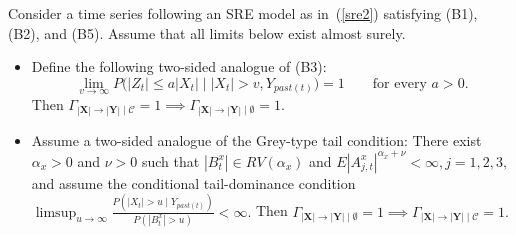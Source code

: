\documentclass[a4paper,11pt]{article}
\newenvironment{customlem}[1]
  {\renewcommand\theinnercustomlem{#1}\innercustomlem}
  {\endinnercustomlem}
\begin{document}
\begin{customlem}{\ref{Theorem1_both_tails_lemma}}
Consider a time series following an SRE model as in~(\ref{sre2}) satisfying
(B1), (B2), and (B5). Assume that all limits below exist almost surely.

\begin{itemize}
    \item Define the following two-sided analogue of (B3):
\[
\tag{B3$^\pm$}
\lim_{v\to\infty}
P\bigl(|Z_t|\leq a|X_t| \mid |X_t|>v,Y_{past(t)}\bigr)=1
\qquad\text{for every }a>0.
\]
Then \(
\Gamma_{|\mathbf X|\to|\mathbf Y|\mid\mathcal C}=1
\implies
\Gamma_{|\mathbf X|\to|\mathbf Y|\mid\emptyset}=1.
\)

 \item Assume a two-sided analogue of the Grey-type tail condition: There exist
\(\alpha_x>0\) and \(\nu>0\) such that \(|B_t^x|\in RV(\alpha_x)\) and
\(
E|A^x_{j,t}|^{\alpha_x+\nu}<\infty,
 j=1,2,3,
\)
and assume the conditional tail-dominance condition
\(
\limsup_{u\to\infty}
\frac{P(|X_t|>u\mid Y_{past(t)})}{P(|B_t^x|>u)}
<\infty.
\) Then \(
\Gamma_{|\mathbf X|\to|\mathbf Y|\mid\emptyset}=1
\implies
\Gamma_{|\mathbf X|\to|\mathbf Y|\mid\mathcal C}=1.
\)
\end{itemize}
\end{customlem}
\end{document}
